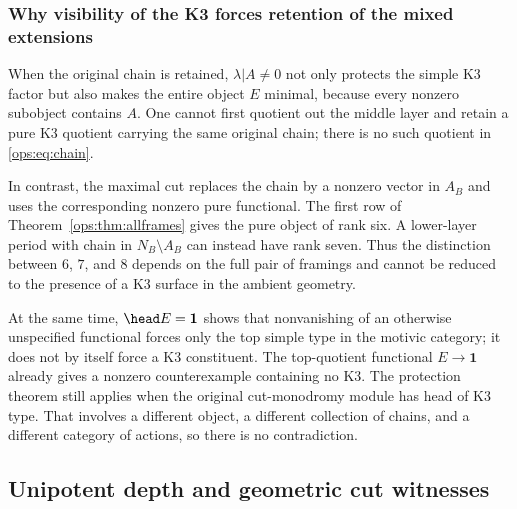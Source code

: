 \documentclass[11pt,a4paper,oneside]{article}
\theoremstyle{plain}
\theoremstyle{definition}
\theoremstyle{remark}
\numberwithin{equation}{section}
\begin{document}
\subsubsection{Why visibility of the K3 forces retention of the mixed extensions}
When the original chain is retained, $\lambda|A\ne0$ not only protects the simple K3 factor
but also makes the entire object $E$ minimal, because every nonzero subobject contains $A$.
One cannot first quotient out the middle layer and retain a pure K3 quotient carrying the same original chain;
there is no such quotient in \eqref{ops:eq:chain}.

In contrast, the maximal cut replaces the chain by a nonzero vector in $A_B$ and uses the corresponding nonzero pure functional.
The first row of Theorem~\ref{ops:thm:allframes} gives the pure object of rank six.
A lower-layer period with chain in $N_B\setminus A_B$ can instead have rank seven.
Thus the distinction between $6$, $7$, and $8$ depends on the full pair of framings and cannot be reduced to the presence of a K3 surface in the ambient geometry.

At the same time, $\head E=\mathbf1$ shows that nonvanishing of an otherwise unspecified functional
forces only the top simple type in the motivic category; it does not by itself force a K3 constituent.
The top-quotient functional $E\to\mathbf1$ already gives a nonzero counterexample containing no K3.
The protection theorem still applies when the original cut-monodromy module has head of K3 type.
That involves a different object, a different collection of chains, and a different category of actions, so there is no contradiction.


\subsection{Unipotent depth and geometric cut witnesses}
\end{document}
